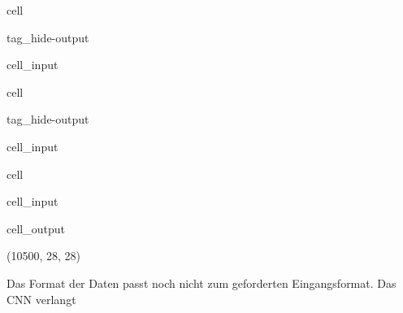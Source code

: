 \documentclass[letterpaper,10pt,english]{jupyterBook}
\begin{document}
\begin{sphinxuseclass}{cell}
\begin{sphinxuseclass}{tag_hide-output}
\begin{sphinxVerbatimInput}
\begin{sphinxuseclass}{cell_input}
\begin{sphinxVerbatim}[commandchars=\\\{\}]
  
  
\end{sphinxVerbatim}

\end{sphinxuseclass}\end{sphinxVerbatimInput}

\end{sphinxuseclass}
\end{sphinxuseclass}
\begin{sphinxuseclass}{cell}
\begin{sphinxuseclass}{tag_hide-output}\begin{sphinxVerbatimInput}

\begin{sphinxuseclass}{cell_input}
\begin{sphinxVerbatim}[commandchars=\\\{\}]
\end{sphinxVerbatim}

\end{sphinxuseclass}\end{sphinxVerbatimInput}

\end{sphinxuseclass}
\end{sphinxuseclass}
\begin{sphinxuseclass}{cell}\begin{sphinxVerbatimInput}

\begin{sphinxuseclass}{cell_input}
\begin{sphinxVerbatim}[commandchars=\\\{\}]
\end{sphinxVerbatim}

\end{sphinxuseclass}\end{sphinxVerbatimInput}
\begin{sphinxVerbatimOutput}

\begin{sphinxuseclass}{cell_output}
\begin{sphinxVerbatim}[commandchars=\\\{\}]
(10500, 28, 28)
\end{sphinxVerbatim}

\end{sphinxuseclass}\end{sphinxVerbatimOutput}

\end{sphinxuseclass}
\sphinxAtStartPar
Das Format der Daten passt noch nicht zum geforderten Eingangsformat.
Das CNN verlangt
\end{document}

